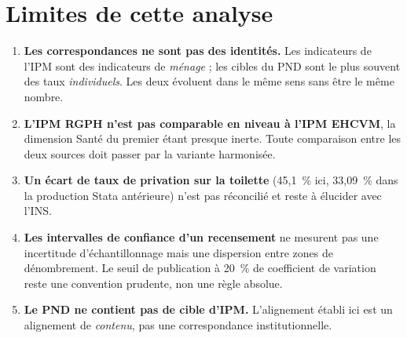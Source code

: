 \documentclass[11pt,a4paper]{article}
\begin{document}
\section{Limites de cette analyse}

\begin{enumerate}
  \item \textbf{Les correspondances ne sont pas des identités.} Les indicateurs de l'IPM sont des
        indicateurs de \emph{ménage} ; les cibles du PND sont le plus souvent des taux
        \emph{individuels}. Les deux évoluent dans le même sens sans être le même nombre.
  \item \textbf{L'IPM RGPH n'est pas comparable en niveau à l'IPM EHCVM}, la dimension Santé du
        premier étant presque inerte. Toute comparaison entre les deux sources doit passer par la
        variante harmonisée.
  \item \textbf{Un écart de taux de privation sur la toilette} (45,1~\% ici, 33,09~\% dans la
        production Stata antérieure) n'est pas réconcilié et reste à élucider avec l'INS.
  \item \textbf{Les intervalles de confiance d'un recensement} ne mesurent pas une incertitude
        d'échantillonnage mais une dispersion entre zones de dénombrement. Le seuil de publication
        à 20~\% de coefficient de variation reste une convention prudente, non une règle absolue.
  \item \textbf{Le PND ne contient pas de cible d'IPM.} L'alignement établi ici est un alignement de
        \emph{contenu}, pas une correspondance institutionnelle.
\end{enumerate}
\end{document}

